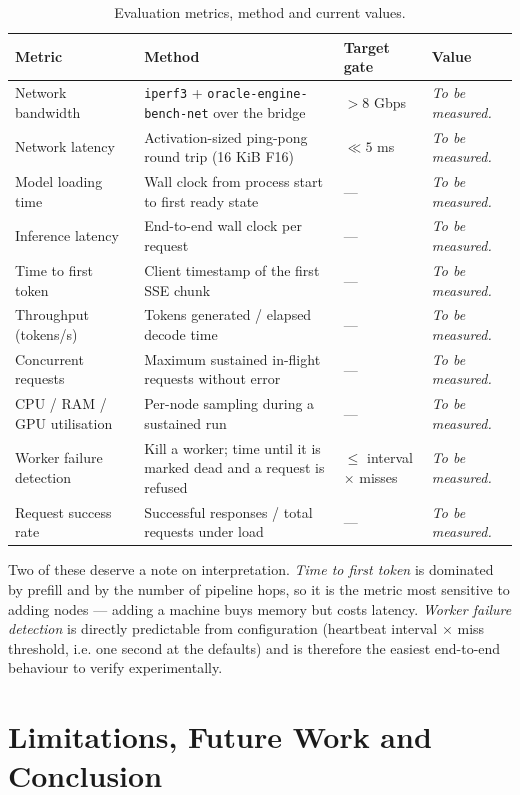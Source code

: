 \documentclass[11pt,a4paper]{article}
\newcommand{\tbm}{\textcolor{ogray}{\emph{To be measured.}}}
\begin{document}
\begin{table}[h]
\centering
\caption{Evaluation metrics, method and current values.}
\label{tab:eval}
\footnotesize
\begin{tabularx}{\textwidth}{@{}l X l l@{}}
\toprule
\textbf{Metric} & \textbf{Method} & \textbf{Target gate} & \textbf{Value} \\
\midrule
Network bandwidth & \texttt{iperf3} + \texttt{oracle-engine-bench-net} over the
  bridge & $>8$ Gbps & \tbm \\
Network latency & Activation-sized ping-pong round trip (16 KiB F16) & $\ll 5$ ms
  & \tbm \\
Model loading time & Wall clock from process start to first ready state & --- & \tbm \\
Inference latency & End-to-end wall clock per request & --- & \tbm \\
Time to first token & Client timestamp of the first SSE chunk & --- & \tbm \\
Throughput (tokens/s) & Tokens generated / elapsed decode time & --- & \tbm \\
Concurrent requests & Maximum sustained in-flight requests without error & --- & \tbm \\
CPU / RAM / GPU utilisation & Per-node sampling during a sustained run & --- & \tbm \\
Worker failure detection & Kill a worker; time until it is marked dead and a
  request is refused & $\le$ interval $\times$ misses & \tbm \\
Request success rate & Successful responses / total requests under load & --- & \tbm \\
\bottomrule
\end{tabularx}
\end{table}

Two of these deserve a note on interpretation. \emph{Time to first token} is
dominated by prefill and by the number of pipeline hops, so it is the metric most
sensitive to adding nodes --- adding a machine buys memory but costs latency.
\emph{Worker failure detection} is directly predictable from configuration
(heartbeat interval $\times$ miss threshold, i.e. one second at the defaults) and
is therefore the easiest end-to-end behaviour to verify experimentally.

\section{Limitations, Future Work and Conclusion}
\label{sec:future}
\end{document}
